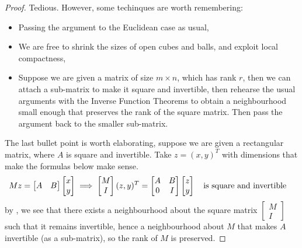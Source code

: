 \documentclass[../main-manifolds.tex]{subfiles}
\begin{document}
\begin{proof}
    Tedious. However, some techinques are worth remembering:
    \begin{itemize}
        \item Passing the argument to the Euclidean case as usual,
        \item We are free to shrink the sizes of open cubes and balls, and exploit local compactness,
        \item Suppose we are given a matrix of size $m\times n$, which has rank $r$, then we can attach a sub-matrix to make it square and invertible, then rehearse the usual arguments with the Inverse Function Theorems  to obtain a neighbourhood small enough that preserves the rank of the square matrix. Then pass the argument back to the smaller sub-matrix.
    \end{itemize}
    The last bullet point is worth elaborating, suppose we are given a rectangular matrix, where $A$ is square and invertible. Take $z = (x,y)^T$ with dimensions that make the formulas below make sense.
    \[
        Mz = \begin{bmatrix}
            A & B
        \end{bmatrix}\begin{bmatrix}
            x\\ y
        \end{bmatrix}\implies \begin{bmatrix}
            M\\ I
        \end{bmatrix}(z,y)^T = \begin{bmatrix}
            A & B\\ 0 & I
        \end{bmatrix}\begin{bmatrix}
            z\\ y
        \end{bmatrix}\qqtext{is square and invertible}
    \]
    by , we see that there exists a neighbourhood about the square matrix $\begin{bmatrix} M\\ I\end{bmatrix}$ such that it remains invertible, hence a neighbourhood about $M$ that makes $A$ invertible (as a sub-matrix), so the rank of $M$ is preserved.
\end{proof}
\end{document}
